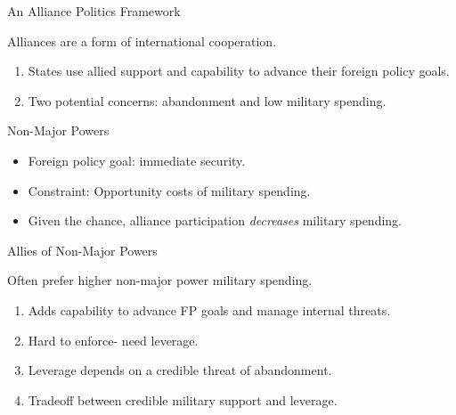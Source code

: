 \documentclass[12pt]{beamer}
\begin{document}
\begin{frame}{An Alliance Politics Framework}

Alliances are a form of international cooperation. 
\begin{enumerate} 
\pause
\item States use allied support and capability to advance their foreign policy goals. 
\pause
\item Two potential concerns: abandonment and low military spending. 
\end{enumerate}  

\end{frame}


\begin{frame}{Non-Major Powers}

\begin{itemize}
\item Foreign policy goal: immediate security.
\pause
\item Constraint: Opportunity costs of military spending.  
\pause
\item Given the chance, alliance participation \emph{decreases} military spending. 
\end{itemize} 

\end{frame}


\begin{frame}{Allies of Non-Major Powers}

Often prefer higher non-major power military spending. 

\begin{enumerate} 
\pause
\item Adds capability to advance FP goals and manage internal threats.  
\pause
\item Hard to enforce- need leverage. 
\pause 
\item Leverage depends on a credible threat of abandonment.  
\pause 
\item Tradeoff between credible military support and leverage.

\end{enumerate}  

\end{frame}

\end{document}
